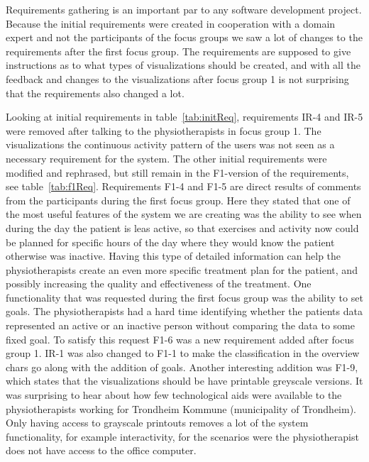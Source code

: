 Requirements gathering is an important par to any software development project. Because the initial requirements were created in cooperation with a domain expert and not the participants of the focus groups we saw a lot of changes to the requirements after the first focus group. The requirements are supposed to give instructions as to what types of visualizations should be created, and with all the feedback and changes to the visualizations after focus group 1 is not surprising that the requirements also changed a lot. 

Looking at initial requirements in table~\ref{tab:initReq}, requirements IR-4 and IR-5 were removed after talking to the physiotherapists in focus group 1. The visualizations the continuous activity pattern of the users was not seen as a necessary requirement for the system. The other initial requirements were modified and rephrased, but still remain in the F1-version of the requirements, see table~\ref{tab:f1Req}. Requirements F1-4 and F1-5 are direct results of comments from the participants during the first focus group. Here they stated that one of the most useful features of the system we are creating was the ability to see when during the day the patient is leas active, so that exercises and activity now could be planned for specific hours of the day where they would know the patient otherwise was inactive. Having this type of detailed information can help the physiotherapists create an even more specific treatment plan for the patient, and possibly increasing the quality and effectiveness of the treatment. One functionality that was requested during the first focus group was the ability to set goals. The physiotherapists had a hard time identifying whether the patients data represented an active or an inactive person without comparing the data to some fixed goal. To satisfy this request F1-6 was a new requirement added after focus group 1. IR-1 was also changed to F1-1 to make the classification in the overview chars go along with the addition of goals. %
Another interesting addition was F1-9, which states that the visualizations should be have printable greyscale versions. It was surprising to hear about how few technological aids were available to the physiotherapists working for Trondheim Kommune (municipality of Trondheim). Only having access to grayscale printouts removes a lot of the system functionality, for example interactivity, for the scenarios were the physiotherapist does not have access to the office computer.

